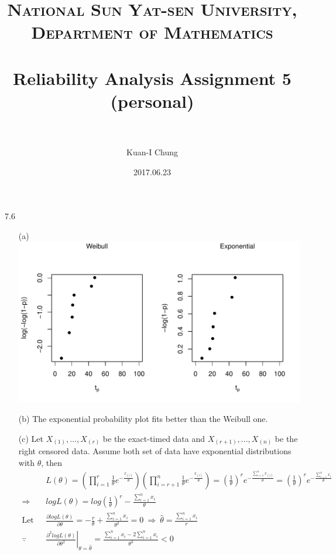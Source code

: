 \documentclass[paper=a4, fontsize=12pt]{scrartcl} %
\title{	
\normalfont \normalsize 
\textsc{National Sun Yat-sen University, Department of Mathematics} \\ [25pt] %
\horrule{0.5pt} \\[0.4cm] %
\huge Reliability Analysis Assignment 5 \\(personal)\\ %
\horrule{2pt} \\[0.5cm] %
}
\author{Kuan-I Chung} %
\date{\normalsize 2017.06.23} %
\numberwithin{equation}{section} %
\numberwithin{figure}{section} %
\numberwithin{table}{section} %
\begin{document}
\maketitle %

7.6
\begin{itemize}
	\item[(a)] 	\ \\ 
			\includegraphics[width = \textwidth]{fig_7_6_a.pdf}
	\item[(b)] 	The exponential probability plot fits better than the Weibull one.
	\item[(c)] 	Let $X_{(1)}, ..., X_{(r)}$ be the exact-timed data and $X_{(r+1)}, ..., X_{(n)}$ be the right censored data. Assume both set of data have exponential distributions with $\theta$, then
			\begin{align*}
				&L(\theta) 		=	\left( \prod_{i = 1}^{r}\frac{1}{\theta}e^{-\frac{x_{(i)}}{\theta}}\right)\left( \prod_{i = r+1}^{n}\frac{1}{\theta}e^{-\frac{x_{(i)}}{\theta}}\right) = \left( \frac{1}{\theta}\right)^re^{-\frac{\sum_{i=1}^nx_{(i)}}{\theta}} = \left( \frac{1}{\theta}\right)^re^{-\frac{\sum_{i=1}^nx_{i}}{\theta}}\\
				\Rightarrow \ \	&log L(\theta) 	=	log \left( \frac{1}{\theta}\right)^r - \frac{\sum_{i=1}^nx_{i}}{\theta} \\
				\text{Let} \ \ \	&\frac{\partial log L(\theta)}{\partial \theta} = -\frac{r}{\theta} +\frac{\sum_{i = 1}^nx_{i}}{\theta^2} = 0\ \Rightarrow \ \widehat{\theta} = \frac{\sum_{i = 1}^nx_{i}}{r}\\
				\because	\ \ &\left. \frac{\partial^2 log L(\theta)}{\partial \theta^2} \right|_{\theta = \widehat{\theta}} = \frac{\sum_{i = 1}^nx_{i} - 2\sum_{i = 1}^nx_{i}}{\theta^3} < 0\\

\end{align*}
\end{itemize}
\end{document}
